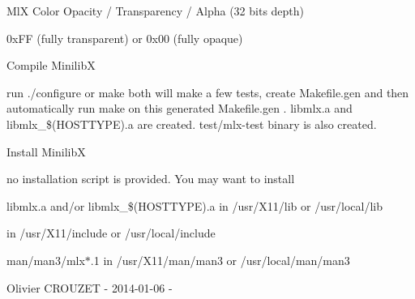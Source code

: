 MlX Color Opacity / Transparency / Alpha (32 bits depth)
\begin{DoxyItemize}
\item 0x\+FF (fully transparent) or 0x00 (fully opaque)
\end{DoxyItemize}

Compile MinilibX


\begin{DoxyItemize}
\item run ./configure or make both will make a few tests, create Makefile.\+gen and then automatically run make on this generated Makefile.\+gen . libmlx.\+a and libmlx\+\_\+\$(\+HOSTTYPE).a are created. test/mlx-\/test binary is also created.
\end{DoxyItemize}

Install MinilibX


\begin{DoxyItemize}
\item no installation script is provided. You may want to install
\begin{DoxyItemize}
\item libmlx.\+a and/or libmlx\+\_\+\$(\+HOSTTYPE).a in /usr/\+X11/lib or /usr/local/lib
\item {} in /usr/\+X11/include or /usr/local/include
\item man/man3/mlx\texorpdfstring{$\ast$}{*}.1 in /usr/\+X11/man/man3 or /usr/local/man/man3
\end{DoxyItemize}
\end{DoxyItemize}

Olivier CROUZET -\/ 2014-\/01-\/06 -\/ 